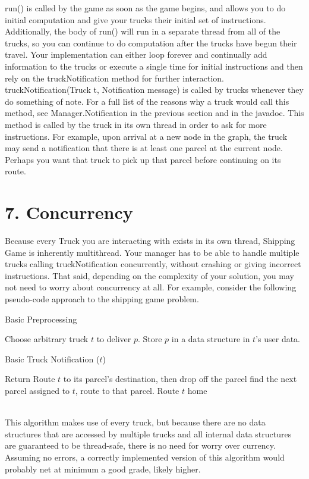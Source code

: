 \documentclass[11pt]{article}
\begin{document}
run() is called by the game as soon as the game begins, and allows you to do initial computation and give your trucks their initial set of instructions. Additionally, the body of run() will run in a separate thread from all of the trucks, so you can continue to do computation after the trucks have begun their travel. Your implementation can either loop forever and continually add information to the trucks or execute a single time for initial instructions and then rely on the truckNotification method for further interaction.\\

truckNotification(Truck t, Notification message) is called by trucks whenever they do something of note. For a full list of the reasons why a truck would call this method, see Manager.Notification in the previous section and in the javadoc. This method is called by the truck in its own thread in order to ask for more instructions. For example, upon arrival at a new node in the graph, the truck may send a notification that there is at least one parcel at the current node. Perhaps you want that truck to pick up that parcel before continuing on its route.

\newpage
\section{7. Concurrency}
Because every Truck you are interacting with exists in its own thread, Shipping Game is inherently multithread. Your manager has to be able to handle multiple trucks calling truckNotification concurrently, without crashing or giving incorrect instructions. That said, depending on the complexity of your solution, you may not need to worry about concurrency at all. For example, consider the following pseudo-code approach to the shipping game problem.
\begin{algorithm}
\caption{Basic Preprocessing} \label{alg:ls}
\begin{algorithmic}[1]
\STATE Choose arbitrary truck $t$ to deliver $p$. Store $p$ in a data structure in $t$'s user data.
\ENDFOR
\end{algorithmic}
\end{algorithm}
\begin{algorithm}
\caption{Basic Truck Notification ($t$)} \label{alg:ls}
\begin{algorithmic}[1]
\STATE Return
\ENDIF
{}
\STATE Route $t$ to its parcel's destination, then drop off the parcel
\ELSE
\STATE find the next parcel assigned to $t$, route to that parcel.
\ENDIF
\ELSE
\STATE Route $t$ home
\ENDIF
\end{algorithmic}
\end{algorithm}
\\This algorithm makes use of every truck, but because there are no data structures that are accessed by multiple trucks and all internal data structures are guaranteed to be thread-safe, there is no need for worry over currency. Assuming no errors, a correctly implemented version of this algorithm  would probably net at minimum a good grade, likely higher.\\
\end{document}
